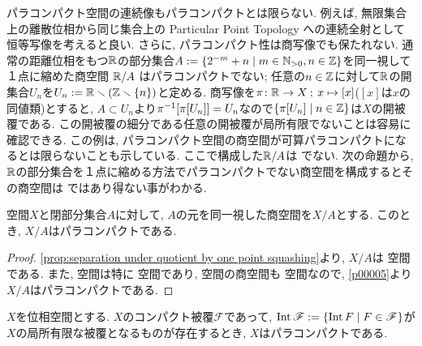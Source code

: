 \documentclass[uplatex, dvipdfmx, a4paper, 12pt, class=jsbook, crop=false]{standalone}
\begin{document}
パラコンパクト空間の連続像もパラコンパクトとは限らない.
例えば, 無限集合上の離散位相から同じ集合上の Particular Point Topology への連続全射として恒等写像を考えると良い.
さらに, パラコンパクト性は商写像でも保たれない.
通常の距離位相をもつ$ \mathbb{R} $の部分集合$ A \defeq \setcomp{2^{-m}+n}{m \in \N_{>0}, n \in \Z} $を同一視して１点に縮めた商空間
$ \mathbb{R} / A $ はパラコンパクトでない; 任意の$ n \in \mathbb{Z} $に対して$ \mathbb{R} $の開集合$ U_n $を$ U_n \mathrel{:=} \mathbb{R} \smallsetminus (\mathbb{Z} \smallsetminus \{n\}) $と定める.
商写像を$ \pi\colon\mathbb{R}\to X\mathpunct{\: ; \:} x\mapsto[x] $($ [x] $は$ x $の同値類)とすると,
$ A \subset U_n $より$ \mapinvset{\pi}{\mapset{\pi}{U_n}}= U_n $なので$ \setcomp{\mapset{\pi}{U_n}}{n \in \Z} $は$ X $の開被覆である.
この開被覆の細分である任意の開被覆が局所有限でないことは容易に確認できる.
この例は, パラコンパクト空間の商空間が可算パラコンパクトになるとは限らないことも示している.
ここで構成した$ \mathbb{R} / A $は  でない.
次の命題から, $ \mathbb{R} $の部分集合を１点に縮める方法でパラコンパクトでない商空間を構成するとその商空間は  ではあり得ない事がわかる.

\begin{proposition}
	 \Lindelof 空間$ X $と閉部分集合$ A $に対して, $ A $の元を同一視した商空間を$ X / A $とする.
	このとき, $ X / A $はパラコンパクトである.
\end{proposition}

\begin{proof}
	\cref{prop:separation under quotient by one point squashing}より,
	$ X / A $は  空間である.
	また,  空間は特に  空間であり, \Lindelof 空間の商空間も
	\Lindelof 空間なので, \cref{p00005}より$ X / A $はパラコンパクトである.
\end{proof}

\begin{proposition}
	\label{prop:existence of a compact covering whose interior is a locally finite covering>ParaCpt}
	$ X $を位相空間とする. $ X $のコンパクト被覆$\mathscr{F}$であって,
	$\topint \mathscr{F} \defeq \setcomp{\topint F}{F \in \mathscr{F}}$が$X$の局所有限な被覆となるものが存在するとき,
	$ X $はパラコンパクトである.
\end{proposition}
\end{document}
